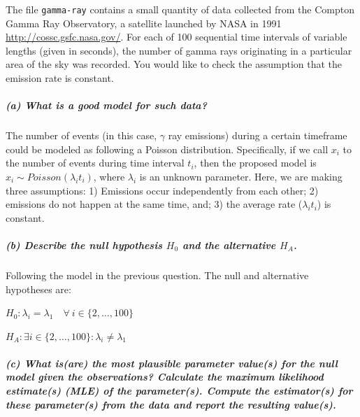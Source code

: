 \documentclass[11pt, english]{article}
\begin{document}
The file \texttt{gamma-ray} contains a small quantity of data collected
from the Compton Gamma Ray Observatory, a satellite launched by NASA in
1991 \url{http://cossc.gsfc.nasa.gov/}. For each of 100 sequential time
intervals of variable lengths (given in seconds), the number of gamma
rays originating in a particular area of the sky was recorded. You would
like to check the assumption that the emission rate is constant.

    \hypertarget{a-what-is-a-good-model-for-such-data}{%
\subparagraph{(a) What is a good model for such
data?\\[2ex]}\label{a-what-is-a-good-model-for-such-data}}

    The number of events (in this case, \(\gamma\) ray emissions) during a
certain timeframe could be modeled as following a Poisson distribution.
Specifically, if we call \(x_i\) to the number of events during time
interval \(t_i\), then the proposed model is
\(x_i \sim Poisson(\lambda_i t_i)\), where \(\lambda_i\) is an unknown
parameter. Here, we are making three assumptions: 1) Emissions occur
independently from each other; 2) emissions do not happen at the same
time, and; 3) the average rate (\(\lambda_i t_i\)) is constant.

    \hypertarget{b-describe-the-null-hypothesis-h_0-and-the-alternative-h_a.}{%
\subparagraph{\texorpdfstring{(b) Describe the null hypothesis \(H_0\)
and the alternative
\(H_A\).\\[2ex]}{(b) Describe the null hypothesis H\_0 and the alternative H\_A.}}\label{b-describe-the-null-hypothesis-h_0-and-the-alternative-h_a.}}

    Following the model in the previous question. The null and alternative
hypotheses are:

\(H_0 : \lambda_i = \lambda_1 \quad \forall\ i \in \{2,\ldots,100\}\)

\(H_A : \exists i \in \{2, \ldots,100\}: \lambda_i \neq \lambda_1\)

    \hypertarget{c-what-isare-the-most-plausible-parameter-values-for-the-null-model-given-the-observations-calculate-the-maximum-likelihood-estimates-mle-of-the-parameters.-compute-the-estimators-for-these-parameters-from-the-data-and-report-the-resulting-values.}{%
\subparagraph{(c) What is(are) the most plausible parameter value(s) for
the null model given the observations? Calculate the maximum likelihood
estimate(s) (MLE) of the parameter(s). Compute the estimator(s) for
these parameter(s) from the data and report the resulting
value(s).\\[2ex]}\label{c-what-isare-the-most-plausible-parameter-values-for-the-null-model-given-the-observations-calculate-the-maximum-likelihood-estimates-mle-of-the-parameters.-compute-the-estimators-for-these-parameters-from-the-data-and-report-the-resulting-values.}}
\end{document}
